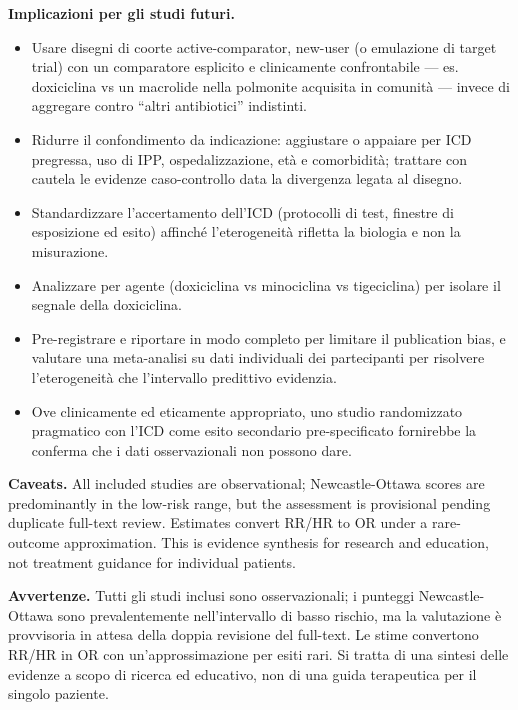 \documentclass[
  letterpaper,
  DIV=11,
  numbers=noendperiod]{scrartcl}
\providecommand{\tightlist}{%
  \setlength{\itemsep}{0pt}\setlength{\parskip}{0pt}}
\begin{document}
\textbf{Implicazioni per gli studi futuri.}

\begin{itemize}
\tightlist
\item
  Usare disegni di coorte active-comparator, new-user (o emulazione di
  target trial) con un comparatore esplicito e clinicamente
  confrontabile --- es. doxiciclina vs un macrolide nella polmonite
  acquisita in comunità --- invece di aggregare contro ``altri
  antibiotici'' indistinti.
\item
  Ridurre il confondimento da indicazione: aggiustare o appaiare per ICD
  pregressa, uso di IPP, ospedalizzazione, età e comorbidità; trattare
  con cautela le evidenze caso-controllo data la divergenza legata al
  disegno.
\item
  Standardizzare l'accertamento dell'ICD (protocolli di test, finestre
  di esposizione ed esito) affinché l'eterogeneità rifletta la biologia
  e non la misurazione.
\item
  Analizzare per agente (doxiciclina vs minociclina vs tigeciclina) per
  isolare il segnale della doxiciclina.
\item
  Pre-registrare e riportare in modo completo per limitare il
  publication bias, e valutare una meta-analisi su dati individuali dei
  partecipanti per risolvere l'eterogeneità che l'intervallo predittivo
  evidenzia.
\item
  Ove clinicamente ed eticamente appropriato, uno studio randomizzato
  pragmatico con l'ICD come esito secondario pre-specificato fornirebbe
  la conferma che i dati osservazionali non possono dare.
\end{itemize}

\begin{tcolorbox}[enhanced jigsaw, arc=.35mm, bottomrule=.15mm, bottomtitle=1mm, breakable, colback=white, colbacktitle=quarto-callout-warning-color!10!white, colframe=quarto-callout-warning-color-frame, coltitle=black, left=2mm, leftrule=.75mm, opacityback=0, opacitybacktitle=0.6, rightrule=.15mm, title=\textcolor{quarto-callout-warning-color}{\faExclamationTriangle}\hspace{0.5em}{Warning}, titlerule=0mm, toprule=.15mm, toptitle=1mm]

\textbf{Caveats.} All included studies are observational;
Newcastle-Ottawa scores are predominantly in the low-risk range, but the
assessment is provisional pending duplicate full-text review. Estimates
convert RR/HR to OR under a rare-outcome approximation. This is evidence
synthesis for research and education, not treatment guidance for
individual patients.

\textbf{Avvertenze.} Tutti gli studi inclusi sono osservazionali; i
punteggi Newcastle-Ottawa sono prevalentemente nell'intervallo di basso
rischio, ma la valutazione è provvisoria in attesa della doppia
revisione del full-text. Le stime convertono RR/HR in OR con
un'approssimazione per esiti rari. Si tratta di una sintesi delle
evidenze a scopo di ricerca ed educativo, non di una guida terapeutica
per il singolo paziente.

\end{tcolorbox}
\end{document}
